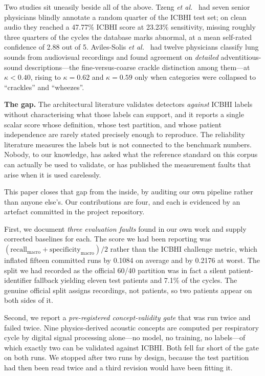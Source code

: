 \documentclass[journal,onecolumn]{IEEEtran}
\begin{document}
Two studies sit uneasily beside all of the above. Tzeng
\emph{et al.}~\cite{tzeng2025jmir} had seven senior physicians blindly annotate a
random quarter of the ICBHI test set; on clean audio they reached a 47.77\% ICBHI
score at 23.23\% sensitivity, missing roughly three quarters of the cycles the
database marks abnormal, at a mean self-rated confidence of 2.88 out of 5.
Aviles-Solis \emph{et al.}~\cite{aviles2016kappa} had twelve physicians classify lung
sounds from audiovisual recordings and found agreement on \emph{detailed}
adventitious-sound descriptions---the fine-versus-coarse crackle distinction among
them---at $\kappa < 0.40$, rising to $\kappa = 0.62$ and $\kappa = 0.59$ only when
categories were collapsed to ``crackles'' and ``wheezes''.

\textbf{The gap.} The architectural literature validates detectors \emph{against}
ICBHI labels without characterising what those labels can support, and it reports a
single scalar score whose definition, whose test partition, and whose patient
independence are rarely stated precisely enough to reproduce. The reliability
literature measures the labels but is not connected to the benchmark numbers. Nobody,
to our knowledge, has asked what the reference standard on this corpus can actually
be used to validate, or has published the measurement faults that arise when it is
used carelessly.

This paper closes that gap from the inside, by auditing our own pipeline rather than
anyone else's. Our contributions are four, and each is evidenced by an artefact
committed in the project repository.

First, we document \emph{three evaluation faults} found in our own work and supply
corrected baselines for each. The score we had been reporting was
$(\text{recall}_{\text{macro}} + \text{specificity}_{\text{macro}})/2$ rather than
the ICBHI challenge metric, which inflated fifteen committed runs by 0.1084 on
average and by 0.2176 at worst. The split we had recorded as the official 60/40
partition was in fact a silent patient-identifier fallback yielding eleven test
patients and 7.1\% of the cycles. The genuine official split assigns recordings, not
patients, so two patients appear on both sides of it.

Second, we report a \emph{pre-registered concept-validity gate} that was run twice and
failed twice. Nine physics-derived acoustic concepts are computed per respiratory
cycle by digital signal processing alone---no model, no training, no labels---of
which exactly two can be validated against ICBHI. Both fell far short of the gate on
both runs. We stopped after two runs by design, because the test partition had then
been read twice and a third revision would have been fitting it.
\end{document}
